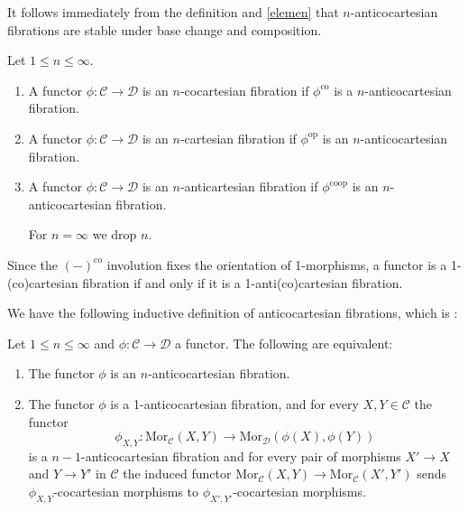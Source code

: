 \documentclass[10pt,oneside]{article}
\numberwithin{equation}{section} %
\numberwithin{figure}{section} %
\theoremstyle{plain}
\theoremstyle{definition}
\newcommand{\mC}{{\mathcal C}}
\newcommand{\mD}{{\mathcal D}}
\newcommand{\X}{X}
\newcommand{\Y}{Y}
\newcommand{\op}{\mathrm{op}}
\newcommand{\co}{\mathrm{co}}
\newcommand{\Mor}{{\mathrm{Mor}}}
\begin{document}
\begin{remark}
It follows immediately from the definition and \cref{elemen} that $n$-anticocartesian fibrations are stable under base change and composition.
\end{remark}



\begin{definition}Let $1 \leq n \leq \infty. $

\begin{enumerate}[\normalfont(1)]\setlength{\itemsep}{-2pt}

\item A functor $\phi: \mC \to \mD$ is an $n$-cocartesian fibration if $\phi^\co$ is a $n$-anticocartesian fibration.

\item A functor $\phi: \mC \to \mD$ is an $n$-cartesian fibration if $\phi^{\op}$ is an $n$-anticocartesian fibration.

\item A functor $\phi: \mC \to \mD$ is an $n$-anticartesian fibration if $\phi^{\co\op}$ is an $n$-anticocartesian fibration.

For $n=\infty$ we drop $n.$

\end{enumerate}
    
\end{definition}

\begin{remark}
Since the $(-)^\co$ involution fixes the orientation of 1-morphisms, a functor is a 1-(co)cartesian fibration if and only if it is a 1-anti(co)cartesian fibration.

\end{remark}


We have the following inductive definition of anticocartesian fibrations, which is \cite[Proposition 3.2.12.]{gepner2026fibrations}:

\begin{proposition}\label{cocarto}
Let $1 \leq n \leq \infty$ and $\phi: \mC \to \mD$ a functor.
The following are equivalent:

\begin{enumerate}[\normalfont(1)]\setlength{\itemsep}{-2pt}
\item The functor $\phi$ is an $n$-anticocartesian fibration.

\item The functor $\phi$ is a 1-anticocartesian fibration, and for every $\X,\Y \in \mC$ the functor
\[
\phi_{X,Y}: \Mor_\mC(\X,\Y) \to \Mor_\mD(\phi(\X),\phi(\Y))
\]
is a $n-1$-anticocartesian fibration
and for every pair of morphisms $X' \to X$ and $Y \to Y'$ in $\mC$
the induced functor 
$\Mor_\mC(\X,\Y) \to \Mor_\mC(X',Y')$ sends $\phi_{X,Y}$-cocartesian morphisms to $\phi_{X',Y'}$-cocartesian morphisms.
\end{enumerate}

\end{proposition}
\end{document}
